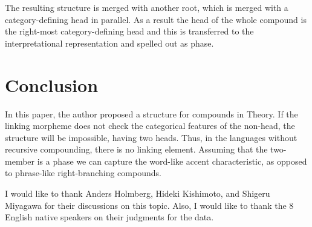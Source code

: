 \documentclass[output=paper]{LSP/langsci}
\begin{document}
The resulting structure is merged with another root, which is merged with a category-defining head in parallel. As a result the head of the whole compound is the right-most category-defining head and this  is transferred to the interpretational representation and spelled out as phase. 

\section{Conclusion} 

In this paper, the author proposed a structure for  compounds in  Theory. If the linking morpheme does not check the categorical features of the non-head, the structure will be impossible, having two heads. Thus, in the languages without recursive compounding, there is no linking element. Assuming that the two-member is a phase we can capture the word-like accent characteristic, as opposed to phrase-like right-branching  compounds.  


I would like to thank Anders Holmberg, Hideki Kishimoto, and Shigeru Miyagawa for their discussions on this topic. Also, I would like to thank the 8 English native speakers on their judgments for the data. 

\printbibliography[heading=subbibliography,notkeyword=this]
\end{document}
